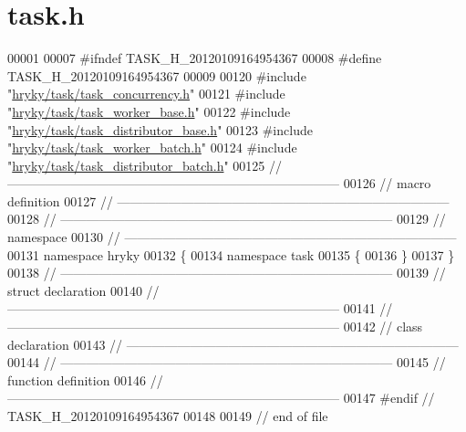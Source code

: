 \hypertarget{task_8h_source}{\section{task.\-h}
}

\begin{DoxyCode}
00001 
00007 \textcolor{preprocessor}{#ifndef TASK\_H\_20120109164954367}
00008 \textcolor{preprocessor}{}\textcolor{preprocessor}{#define TASK\_H\_20120109164954367}
00009 \textcolor{preprocessor}{}
00120 \textcolor{preprocessor}{#include "\hyperlink{task__concurrency_8h}{hryky/task/task_concurrency.h}"}
00121 \textcolor{preprocessor}{#include "\hyperlink{task__worker__base_8h}{hryky/task/task_worker_base.h}"}
00122 \textcolor{preprocessor}{#include "\hyperlink{task__distributor__base_8h}{hryky/task/task_distributor_base.h}"}
00123 \textcolor{preprocessor}{#include "\hyperlink{task__worker__batch_8h}{hryky/task/task_worker_batch.h}"}
00124 \textcolor{preprocessor}{#include "\hyperlink{task__distributor__batch_8h}{hryky/task/task_distributor_batch.h}"}
00125 \textcolor{comment}{//
      ------------------------------------------------------------------------------}
00126 \textcolor{comment}{// macro definition}
00127 \textcolor{comment}{//
      ------------------------------------------------------------------------------}
00128 \textcolor{comment}{//
      ------------------------------------------------------------------------------}
00129 \textcolor{comment}{// namespace}
00130 \textcolor{comment}{//
      ------------------------------------------------------------------------------}
00131 \textcolor{keyword}{namespace }hryky
00132 \{
00134 \textcolor{keyword}{namespace }task
00135 \{
00136 \}
00137 \}
00138 \textcolor{comment}{//
      ------------------------------------------------------------------------------}
00139 \textcolor{comment}{// struct declaration}
00140 \textcolor{comment}{//
      ------------------------------------------------------------------------------}
00141 \textcolor{comment}{//
      ------------------------------------------------------------------------------}
00142 \textcolor{comment}{// class declaration}
00143 \textcolor{comment}{//
      ------------------------------------------------------------------------------}
00144 \textcolor{comment}{//
      ------------------------------------------------------------------------------}
00145 \textcolor{comment}{// function definition}
00146 \textcolor{comment}{//
      ------------------------------------------------------------------------------}
00147 \textcolor{preprocessor}{#endif // TASK\_H\_20120109164954367}
00148 \textcolor{preprocessor}{}
00149 \textcolor{comment}{// end of file}
\end{DoxyCode}
